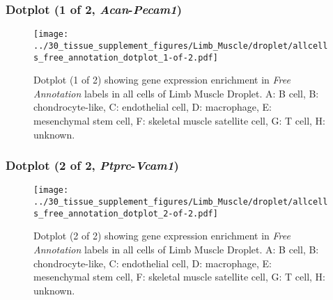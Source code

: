 \clearpage

\subsubsection{Dotplot (1 of 2, \emph{Acan}-\emph{Pecam1})}
\begin{figure}[h]
\centering
\texttt{[image: ../30\_tissue\_supplement\_figures/Limb\_Muscle/droplet/allcells\_free\_annotation\_dotplot\_1-of-2.pdf]}

\caption{ Dotplot (1 of 2)  showing gene expression enrichment in \emph{Free Annotation} labels in all cells of Limb Muscle Droplet. A: B cell, B: chondrocyte-like, C: endothelial cell, D: macrophage, E: mesenchymal stem cell, F: skeletal muscle satellite cell, G: T cell, H: unknown.}
\end{figure}


\clearpage

\subsubsection{Dotplot (2 of 2, \emph{Ptprc}-\emph{Vcam1})}
\begin{figure}[h]
\centering
\texttt{[image: ../30\_tissue\_supplement\_figures/Limb\_Muscle/droplet/allcells\_free\_annotation\_dotplot\_2-of-2.pdf]}

\caption{ Dotplot (2 of 2)  showing gene expression enrichment in \emph{Free Annotation} labels in all cells of Limb Muscle Droplet. A: B cell, B: chondrocyte-like, C: endothelial cell, D: macrophage, E: mesenchymal stem cell, F: skeletal muscle satellite cell, G: T cell, H: unknown.}
\end{figure}

